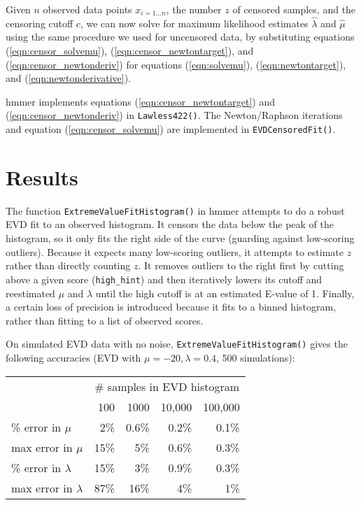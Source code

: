 Given $n$ observed data points $x_{i = 1 \ldots n}$, the number $z$ of
censored samples, and the censoring cutoff $c$, we can now solve for
maximum likelihood estimates $\hat{\lambda}$ and $\hat{\mu}$ using the
same procedure we used for uncensored data, by substituting equations
(\ref{eqn:censor_solvemu}), (\ref{eqn:censor_newtontarget}), and
(\ref{eqn:censor_newtonderiv}) for equations (\ref{eqn:solvemu}),
(\ref{eqn:newtontarget}), and (\ref{eqn:newtonderivative}).

{\sc hmmer} implements equations (\ref{eqn:censor_newtontarget}) and
(\ref{eqn:censor_newtonderiv}) in {\tt Lawless422()}. The
Newton/Raphson iterations and equation (\ref{eqn:censor_solvemu}) are
implemented in {\tt EVDCensoredFit()}.

\section{Results}

The function {\tt ExtremeValueFitHistogram()} in {\sc hmmer} attempts
to do a robust EVD fit to an observed histogram. It censors the data
below the peak of the histogram, so it only fits the right side of the
curve (guarding against low-scoring outliers). Because it expects many
low-scoring outliers, it attempts to estimate $z$ rather than directly
counting $z$.  It removes outliers to the right first by cutting above
a given score ({\tt high\_hint}) and then iteratively lowers its cutoff
and reestimated $\mu$ and $\lambda$ until the high cutoff is at an
estimated E-value of 1. Finally, a certain loss of precision is
introduced because it fits to a binned histogram, rather than fitting
to a list of observed scores. 

On simulated EVD data with no noise, {\tt ExtremeValueFitHistogram()}
gives the following accuracies (EVD with $\mu = -20, \lambda = 0.4$,
500 simulations):

\begin{center}
\begin{tabular}{lrrrr} \hline
 & \multicolumn{4}{c}{\# samples in EVD histogram}\\
                        & 100 & 1000  & 10,000 & 100,000 \\
\% error in $\mu$       &  2\%& 0.6\% &  0.2\% &  0.1\%  \\
max error in $\mu$      & 15\%&   5\% &  0.6\% &  0.3\%  \\
\% error in $\lambda$   & 15\%&   3\% &  0.9\% &  0.3\%  \\
max error in $\lambda$  & 87\%&  16\% &    4\% &    1\%  \\ \hline
\end{tabular}
\end{center}

